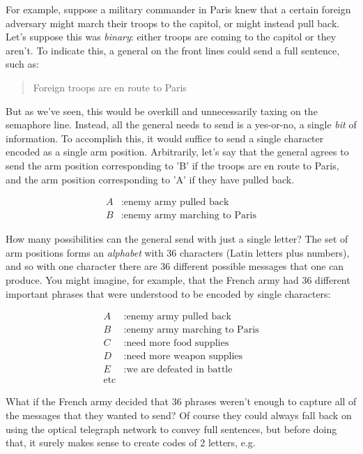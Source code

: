 \documentclass[UTF8]{book}
\begin{document}
\begin{CJK}{UTF8}{gbsn}
For example, suppose a military commander in Paris knew that a certain foreign adversary might march their troops to the capitol, or might instead pull back. Let's suppose this was \emph{binary}: either troops are coming to the capitol or they aren't. To indicate this, a general on the front lines could send a full sentence, such as:

\begin{quotation}
Foreign troops are en route to Paris
\end{quotation}

But as we've seen, this would be overkill and unnecessarily taxing on the semaphore line. Instead, all the general needs to send is a yes-or-no, a single \emph{bit} of information. To accomplish this, it would suffice to send a single character encoded as a single arm position. Arbitrarily, let's say that the general agrees to send the arm position corresponding to 'B' if the troops are en route to Paris, and the arm position corresponding to 'A' if they have pulled back.

\begin{align*}
	A&: \text{enemy army pulled back} \\
	B&: \text{enemy army marching to Paris}
\end{align*}

How many possibilities can the general send with just a single letter? The set of arm positions forms an \emph{alphabet} with 36 characters (Latin letters plus numbers), and so with one character there are 36 different possible messages that one can produce. You might imagine, for example, that the French army had 36 different important phrases that were understood to be encoded by single characters:

\begin{align*}
	A&: \text{enemy army pulled back} \\
	B&: \text{enemy army marching to Paris} \\
	C&: \text{need more food supplies} \\
        D&: \text{need more weapon supplies} \\
        E&: \text{we are defeated in battle} \\
        \text{etc} &
\end{align*}

What if the French army decided that 36 phrases weren't enough to capture all of the messages that they wanted to send? Of course they could always fall back on using the optical telegraph network to convey full sentences, but before doing that, it surely makes sense to create codes of 2 letters, e.g.


\end{CJK}
\end{document}
